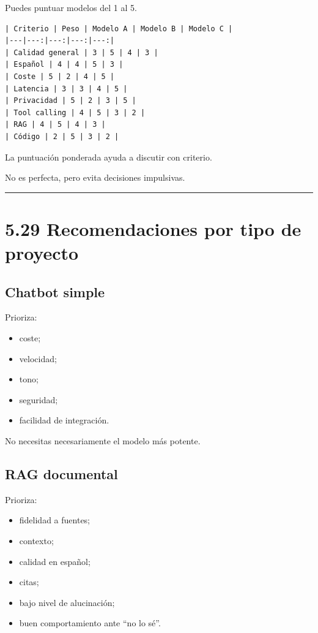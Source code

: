 Puedes puntuar modelos del 1 al 5.

\begin{lstlisting}
| Criterio | Peso | Modelo A | Modelo B | Modelo C |
|---|---:|---:|---:|---:|
| Calidad general | 3 | 5 | 4 | 3 |
| Español | 4 | 4 | 5 | 3 |
| Coste | 5 | 2 | 4 | 5 |
| Latencia | 3 | 3 | 4 | 5 |
| Privacidad | 5 | 2 | 3 | 5 |
| Tool calling | 4 | 5 | 3 | 2 |
| RAG | 4 | 5 | 4 | 3 |
| Código | 2 | 5 | 3 | 2 |
\end{lstlisting}

La puntuación ponderada ayuda a discutir con criterio.

No es perfecta, pero evita decisiones impulsivas.

\begin{center}\rule{0.5\linewidth}{0.5pt}\end{center}

\section{5.29 Recomendaciones por tipo de
proyecto}\label{recomendaciones-por-tipo-de-proyecto}

\subsection{Chatbot simple}\label{chatbot-simple}

Prioriza:

\begin{itemize}
\tightlist
\item
  coste;
\item
  velocidad;
\item
  tono;
\item
  seguridad;
\item
  facilidad de integración.
\end{itemize}

No necesitas necesariamente el modelo más potente.

\subsection{RAG documental}\label{rag-documental}

Prioriza:

\begin{itemize}
\tightlist
\item
  fidelidad a fuentes;
\item
  contexto;
\item
  calidad en español;
\item
  citas;
\item
  bajo nivel de alucinación;
\item
  buen comportamiento ante ``no lo sé''.
\end{itemize}

